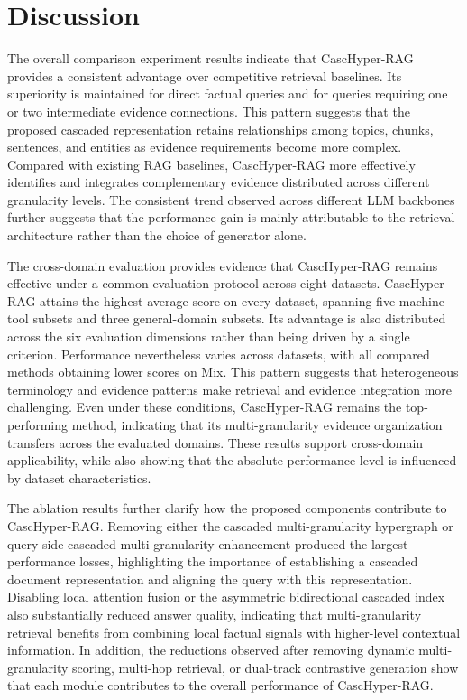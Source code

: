 \documentclass[a4paper,fleqn]{cas-dc}
\begin{document}
\section{Discussion}\label{sec:discussion}

The overall comparison experiment results indicate that CascHyper-RAG provides a consistent advantage over competitive retrieval baselines. Its superiority is maintained for direct factual queries and for queries requiring one or two intermediate evidence connections. This pattern suggests that the proposed cascaded representation retains relationships among topics, chunks, sentences, and entities as evidence requirements become more complex. Compared with existing RAG baselines, CascHyper-RAG more effectively identifies and integrates complementary evidence distributed across different granularity levels. The consistent trend observed across different LLM backbones further suggests that the performance gain is mainly attributable to the retrieval architecture rather than the choice of generator alone.

The cross-domain evaluation provides evidence that CascHyper-RAG remains effective under a common evaluation protocol across eight datasets. CascHyper-RAG attains the highest average score on every dataset, spanning five machine-tool subsets and three general-domain subsets. Its advantage is also distributed across the six evaluation dimensions rather than being driven by a single criterion. Performance nevertheless varies across datasets, with all compared methods obtaining lower scores on Mix. This pattern suggests that heterogeneous terminology and evidence patterns make retrieval and evidence integration more challenging. Even under these conditions, CascHyper-RAG remains the top-performing method, indicating that its multi-granularity evidence organization transfers across the evaluated domains. These results support cross-domain applicability, while also showing that the absolute performance level is influenced by dataset characteristics.

The ablation results further clarify how the proposed components contribute to CascHyper-RAG. Removing either the cascaded multi-granularity hypergraph or query-side cascaded multi-granularity enhancement produced the largest performance losses, highlighting the importance of establishing a cascaded document representation and aligning the query with this representation. Disabling local attention fusion or the asymmetric bidirectional cascaded index also substantially reduced answer quality, indicating that multi-granularity retrieval benefits from combining local factual signals with higher-level contextual information. In addition, the reductions observed after removing dynamic multi-granularity scoring, multi-hop retrieval, or dual-track contrastive generation show that each module contributes to the overall performance of CascHyper-RAG.
\end{document}
